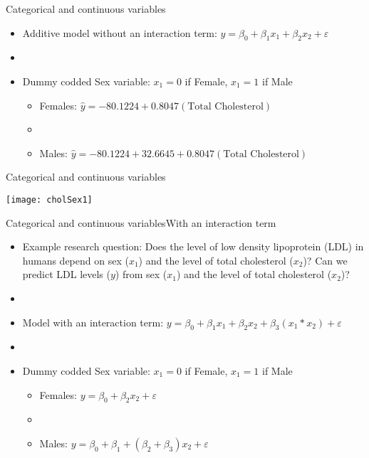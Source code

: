 \documentclass[xcolor=dvipsnames]{beamer}
\begin{document}
\begin{frame}{Categorical and continuous variables}
	\begin{itemize}
		\item Additive model without an interaction term: $y = \beta_0 + \beta_1 x_1 + \beta_2 x_2 + \varepsilon $ \pause
		\item[]
		\item Dummy codded Sex variable: $x_1 = 0$ if Female, $x_1 = 1$ if Male \pause
		\begin{itemize}
			\item Females: $\hat{y} = -80.1224 + 0.8047 (\text{Total Cholesterol})  $
			\item[]
			\item Males: $\hat{y} = -80.1224 + 32.6645 + 0.8047(\text{Total Cholesterol}) $
		\end{itemize}
	\end{itemize}
\end{frame}

\begin{frame}{Categorical and continuous variables}
	\begin{center}
		\texttt{[image: cholSex1]}
	\end{center}
\end{frame}

\begin{frame}{Categorical and continuous variables}{With an interaction term}
	\begin{itemize}
		\item Example research question: Does the level of low density lipoprotein (LDL) in humans depend on sex ($x_1$) and the level of total cholesterol ($x_2$)? Can we predict LDL levels ($y$) from sex ($x_1$) and the level of total cholesterol ($x_2$)? \pause
		\item[]
		\item Model with an interaction term: $y = \beta_0 + \beta_1 x_1 + \beta_2 x_2 + \beta_3 (x_1 * x_2) + \varepsilon $ \pause
		\item[]
		\item Dummy codded Sex variable: $x_1 = 0$ if Female, $x_1 = 1$ if Male \pause
		\begin{itemize}
			\item Females: $y = \beta_0 + \beta_2 x_2 + \varepsilon $ \pause
			\item[]
			\item Males: $y = \beta_0 + \beta_1 + (\beta_2 + \beta_3) x_2 + \varepsilon $
		\end{itemize}
	\end{itemize}
\end{frame}
\end{document}
